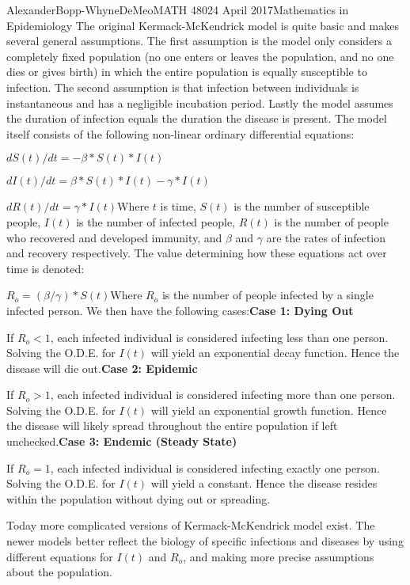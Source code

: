\documentclass[12pt, letterpaper]{article}
\begin{document}
\begin{mla}{Alexander}{Bopp-Whyne}{DeMeo}{MATH 480}{24 April 2017}{Mathematics in Epidemiology}
The original Kermack-McKendrick model is quite basic and makes several general assumptions. The first assumption is the model only considers a completely fixed population (no one enters or leaves the population, and no one dies or gives birth) in which the entire population is equally susceptible to infection. The second assumption is that infection between individuals is instantaneous and has a negligible incubation period. Lastly the model assumes the duration of infection equals the duration the disease is present. The model itself consists of the following non-linear ordinary differential equations:

\(dS(t)/dt = -\beta*S(t)*I(t)\)

\(dI(t)/dt = \beta*S(t)*I(t) - \gamma*I(t)\)

\(dR(t)/dt = \gamma*I(t)\)\linebreak Where \(t\) is time, \(S(t)\) is the number of susceptible people, \(I(t)\) is the number of infected people, \(R(t)\) is the number of people who recovered and developed immunity, and \(\beta\) and \(\gamma\) are the rates of infection and recovery respectively. The value determining how these equations act over time is denoted:

\(R_o = (\beta/\gamma)*S(t)\)\linebreak Where \(R_o\) is the number of people infected by a single infected person. We then have the following cases:\linebreak \textbf{Case 1: Dying Out}

If \(R_o < 1\), each infected individual is considered infecting less than one person. Solving the O.D.E. for \(I(t)\) will yield an exponential decay function. Hence the disease will die out.\linebreak \textbf{Case 2: Epidemic}

If \(R_o > 1\), each infected individual is considered infecting more than one person. Solving the O.D.E. for \(I(t)\) will yield an exponential growth function. Hence the disease will likely spread throughout the entire population if left unchecked.\linebreak \textbf{Case 3: Endemic (Steady State)}

If \(R_o=1\), each infected individual is considered infecting exactly one person. Solving the O.D.E. for \(I(t)\) will yield a constant. Hence the disease resides within the population without dying out or spreading.

Today more complicated versions of Kermack-McKendrick model exist. The newer models better reflect the biology of specific infections and diseases  by using different equations for \(I(t)\) and \(R_o\), and making more precise assumptions about the population. 


\end{mla}
\end{document}
